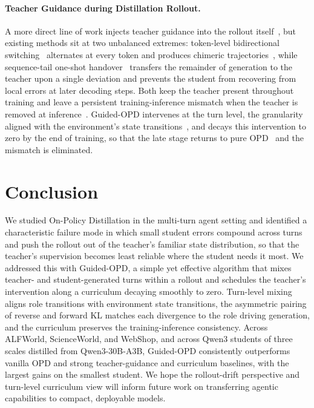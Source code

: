 \documentclass[11pt]{article}
\begin{document}
\paragraph{Teacher Guidance during Distillation Rollout.}
A more direct line of work injects teacher guidance into the rollout itself~\citep{SKD, AdaSwitch}, but existing methods sit at two unbalanced extremes: token-level bidirectional switching~\citep{SWITCH, SKD} alternates at every token and produces chimeric trajectories~\citep{AdaSwitch}, while sequence-tail one-shot handover~\citep{AdaSwitch} transfers the remainder of generation to the teacher upon a single deviation and prevents the student from recovering from local errors at later decoding steps.
Both keep the teacher present throughout training and leave a persistent training-inference mismatch when the teacher is removed at inference~\citep{fu2026revisiting}.
Guided-OPD intervenes at the turn level, the granularity aligned with the environment's state transitions~\citep{xue2025simpletir,zhou2024archer}, and decays this intervention to zero by the end of training, so that the late stage returns to pure OPD~\citep{opd} and the mismatch is eliminated.

\section{Conclusion}
We studied On-Policy Distillation in the multi-turn agent setting and identified a characteristic failure mode in which small student errors compound across turns and push the rollout out of the teacher's familiar state distribution, so that the teacher's supervision becomes least reliable where the student needs it most. We addressed this with Guided-OPD, a simple yet effective algorithm that mixes teacher- and student-generated turns within a rollout and schedules the teacher's intervention along a curriculum decaying smoothly to zero. Turn-level mixing aligns role transitions with environment state transitions, the asymmetric pairing of reverse and forward KL matches each divergence to the role driving generation, and the curriculum preserves the training-inference consistency. Across ALFWorld, ScienceWorld, and WebShop, and across Qwen3 students of three scales distilled from Qwen3-30B-A3B, Guided-OPD consistently outperforms vanilla OPD and strong teacher-guidance and curriculum baselines, with the largest gains on the smallest student. We hope the rollout-drift perspective and turn-level curriculum view will inform future work on transferring agentic capabilities to compact, deployable models.
\end{document}

